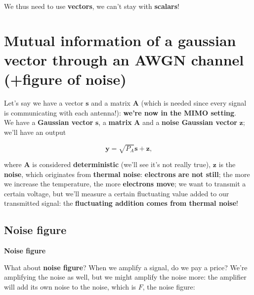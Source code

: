 \documentclass[a4paper, 11pt]{book}
\begin{document}
\vspace{0.5em}
We thus need to use \textbf{vectors}, we can't stay with \textbf{scalars}!

\section[Mutual information of a gaussian vector through an AWGN channel]{Mutual information of a gaussian vector through an AWGN channel (+figure of noise)}

Let's say we have a vector $\mathbf{s}$ and a matrix $\mathbf{A}$ (which is needed since every signal is communicating with each antenna!): \textbf{we're now in the MIMO setting}.\\
We have a \textbf{Gaussian vector} $\mathbf{s}$, a \textbf{matrix} $\mathbf{A}$ and a \textbf{noise Gaussian vector} $\mathbf{z}$; we'll have an output

$$
\mathbf{y} = \sqrt{P_A} \mathbf{s} + \mathbf{z}\text{,}
$$

where $\mathbf{A}$ is considered \textbf{deterministic} (we'll see it's not really true), $\mathbf{z}$ is the \textbf{noise}, which originates from \textbf{thermal noise}: \textbf{electrons are not still}; the more we increase the temperature, the more \textbf{electrons move}; we want to transmit a certain voltage, but we'll measure a certain fluctuating value added to our transmitted signal: the \textbf{fluctuating addition comes from thermal noise}!

\subsection{Noise figure}

\begin{tcolorbox}[colframe=cyan!80!blue, colback=white, boxrule=1pt, arc=2pt]
\textbf{\small {} Noise figure}

What about \textbf{noise figure}?
When we amplify a signal, do we pay a price? We're amplifying the noise as well, but we might amplify the noise more: the amplifier will add its own noise to the noise, which is $F$, the noise figure:
\end{tcolorbox}
\vspace{1em}
\end{document}
